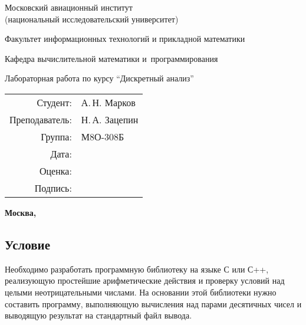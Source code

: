 \documentclass[12pt]{article}
\begin{document}
\thispagestyle{empty}
\begin{center}
    {\Large Московский авиационный институт\\ (национальный исследовательский университет)}

    \vspace{48pt}

    {\large Факультет информационных технологий и прикладной математики}

    \vspace{36pt}

    {\large Кафедра вычислительной математики и~программирования}

    \vspace{48pt}
    
    Лабораторная работа  по курсу \enquote{Дискретный анализ}

\end{center}
    
    \vspace{72pt}
    
    \begin{flushright}
    \begin{tabular}{rl}
    Студент: & А.\,Н. Марков \\
    Преподаватель: & Н.\,А. Зацепин \\
    Группа: & М8О-308Б \\
    Дата: & \\
    Оценка: & \\
    Подпись: & \\
    \end{tabular}
    \end{flushright}
    
    \vfill
    
    \begin{center}
    \bfseries
    Москва, \the\year
\end{center}

\newpage

\subsection*{Условие}

Необходимо разработать программную библиотеку на языке С или С++, реализующую простейшие арифметические действия и проверку условий над целыми неотрицательными числами. На основании этой библиотеки нужно составить программу, выполняющую вычисления над парами десятичных чисел и выводящую результат на стандартный файл вывода.
\end{document}
